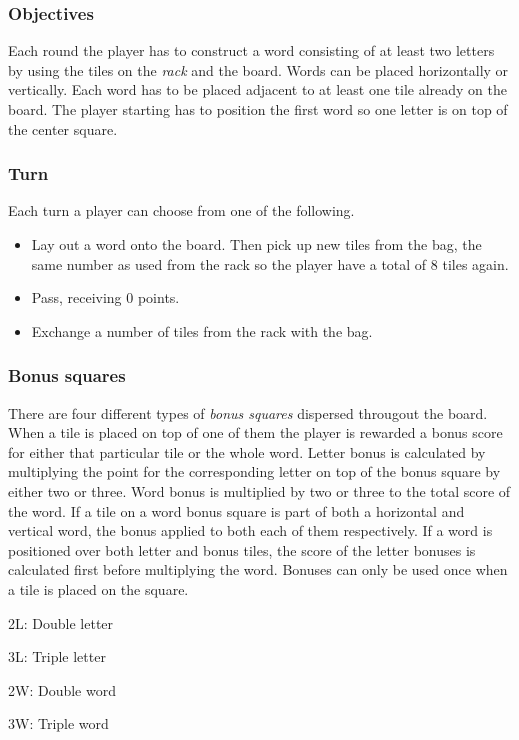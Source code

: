 \documentclass[a4paper, 12pt]{report}
\begin{document}
\subsubsection{Objectives}
Each round the player has to construct a word consisting of at least two letters by using the tiles on the \emph{rack} and the board. Words can be placed horizontally or vertically. Each word has to be placed adjacent to at least one tile already on the board. The player starting has to position the first word so one letter is on top of the center square.

\subsubsection{Turn}
Each turn a player can choose from one of the following.
\begin{itemize}
\item Lay out a word onto the board. Then pick up new tiles from the bag, the same number as used from the rack so the player have a total of 8 tiles again.
\item Pass, receiving 0 points.
\item Exchange a number of tiles from the rack with the bag.
\end{itemize}

\subsubsection{Bonus squares}
There are four different types of \emph{bonus squares} dispersed througout the board. When a tile is placed on top of one of them the player is rewarded a bonus score for either that particular tile or the whole word. Letter bonus is calculated by multiplying the point for the corresponding letter on top of the bonus square by either two or three. Word bonus is multiplied by two or three to the total score of the word. If a tile on a word bonus square is part of both a horizontal and vertical word, the bonus applied to both each of them respectively. If a word is positioned over both letter and bonus tiles, the score of the letter bonuses is calculated first before multiplying the word. Bonuses can only be used once when a tile is placed on the square.

\begin{description}
\item{2L:} Double letter
\item{3L:} Triple letter
\item{2W:} Double word
\item{3W:} Triple word
\end{description}
\end{document}
